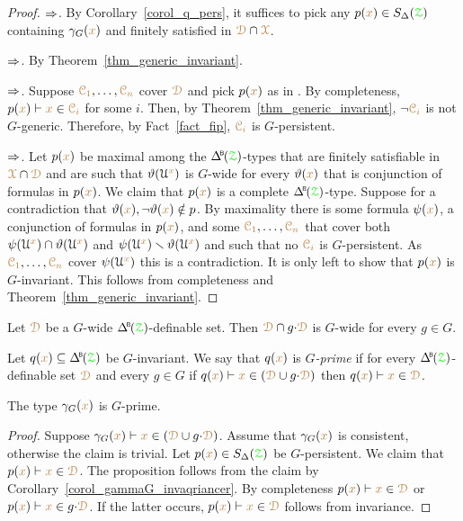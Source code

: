 \begin{proof}
  $\Rightarrow$.
  By Corollary~\ref{corol_q_pers}, it suffices to pick any $p({\color{brown} x})\in S_\Delta({\color{green}\EuScript Z})$ containing $\gamma_G({\color{brown} x})$ and finitely satisfied in ${\color{brown}\EuScript D}\cap{\color{brown}\EuScript X}$.
  
  $\Rightarrow$.
  By Theorem~\ref{thm_generic_invariant}.

  $\Rightarrow$.
  Suppose ${\color{brown}\EuScript C_1},\dots,{\color{brown}\EuScript C_n}$ cover ${\color{brown}\EuScript D}$ and pick $p({\color{brown} x})$ as in .
  By completeness, $p({\color{brown} x})\vdash {\color{brown}x}\in{\color{brown}\EuScript C_i}$ for some $i$.
  Then, by Theorem~\ref{thm_generic_invariant}, $\neg{\color{brown}\EuScript C_i}$ is not $G$-generic.
  Therefore, by Fact~\ref{fact_fip}, ${\color{brown}\EuScript C_i}$ is $G$-persistent.

  $\Rightarrow$.
  Let $p({\color{brown} x})$ be maximal among the $\BDelta({\grZ})$-types that are finitely satisfiable in ${\color{brown}\EuScript X}\cap{\color{brown}\EuScript D}$ and are such that $\vartheta(\EuScript U^{\color{brown} x})$ is $G$-wide for every $\vartheta({\color{brown} x})$ that is conjunction of formulas in $p({\color{brown} x})$.
  We claim that $p({\color{brown} x})$ is a complete $\BDelta({\grZ})$-type.
  Suppose for a contradiction that $\vartheta({\color{brown} x}),\neg\vartheta({\color{brown} x})\notin p$.
  By maximality there is some formula $\psi({\color{brown} x})$, a conjunction of formulas in $p({\color{brown} x})$, and some ${\color{brown}\EuScript C_1},\dots,{\color{brown}\EuScript C_n}$ that cover both $\psi(\EuScript U^{\color{brown} x})\cap\vartheta(\EuScript U^{\color{brown} x})$ and $\psi(\EuScript U^{\color{brown} x})\smallsetminus\vartheta(\EuScript U^{\color{brown} x})$ and such that no ${\color{brown}\EuScript C_i}$ is $G$-persistent.
  As ${\color{brown}\EuScript C_1},\dots,{\color{brown}\EuScript C_n}$ cover $\psi(\EuScript U^{\color{brown} x})$ this is a contradiction.
  It is only left to show that $p({\color{brown} x})$ is $G$-invariant.
  This follows from completeness and Theorem~\ref{thm_generic_invariant}.
\end{proof}

\begin{corollary}\label{corol_intersectionGwide}
  Let ${\color{brown}\EuScript D}$ be a $G$-wide $\BDelta(\grZ)$-definable set.
  Then ${\color{brown}\EuScript D}\cap g{\cdot}{\color{brown}\EuScript D}$ is $G$-wide for every $g\in G$.
\end{corollary}

Let $q({\mr x})\subseteq\BDelta(\grZ)$ be $G$-invariant.
We say that $q({\color{brown} x})$ is \emph{$G$-prime\/} if for every $\BDelta(\grZ)$-definable set ${\color{brown}\EuScript D}$ and every $g\in G$ if $q({\color{brown} x})\vdash{\color{brown}x}\in({\color{brown}\EuScript D}\cup g{\cdot}{\color{brown}\EuScript D})$ then $q({\color{brown} x})\vdash{\color{brown}x}\in{\color{brown}\EuScript D}$.

\begin{proposition}
  The type $\gamma_G({\color{brown} x})$ is $G$-prime.
\end{proposition}

\begin{proof}
  Suppose $\gamma_G({\color{brown} x})\vdash{\color{brown}x}\in({\color{brown}\EuScript D}\cup g{\cdot}{\color{brown}\EuScript D})$.
  Assume that $\gamma_G({\color{brown} x})$ is consistent, otherwise the claim is trivial.
  Let $p({\color{brown} x})\in S_\Delta({\color{green}\EuScript Z})$ be $G$-persistent.
  We claim that $p({\color{brown} x})\vdash{\color{brown}x}\in{\color{brown}\EuScript D}$.
  The proposition follows from the claim by Corollary~\ref{corol_gammaG_invaqriancer}.
  By completeness $p({\color{brown} x})\vdash{\color{brown}x}\in{\color{brown}\EuScript D}$ or $p({\color{brown} x})\vdash{\color{brown}x}\in g{\cdot}{\color{brown}\EuScript D}$.
  If the latter occurs, $p({\color{brown} x})\vdash{\color{brown}x}\in{\color{brown}\EuScript D}$ follows from invariance.
\end{proof}

